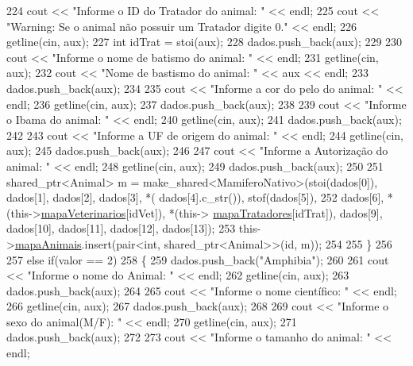 \begin{DoxyCode}
224         cout << \textcolor{stringliteral}{"Informe o ID do Tratador do animal: "} << endl;
225         cout << \textcolor{stringliteral}{"Warning: Se o animal não possuir um Tratador digite 0."} << endl;
226         getline(cin, aux);
227         \textcolor{keywordtype}{int} idTrat = stoi(aux);
228         dados.push\_back(aux);
229 
230         cout << \textcolor{stringliteral}{"Informe o nome de batismo do animal: "} << endl;
231         getline(cin, aux);
232         cout << \textcolor{stringliteral}{"Nome de bastismo do animal: "} << aux << endl;
233         dados.push\_back(aux);
234 
235         cout << \textcolor{stringliteral}{"Informe a cor do pelo do animal: "} << endl;
236         getline(cin, aux);
237         dados.push\_back(aux);
238 
239         cout << \textcolor{stringliteral}{"Informe o Ibama do animal: "} << endl;
240         getline(cin, aux);
241         dados.push\_back(aux);
242 
243         cout << \textcolor{stringliteral}{"Informe a UF de origem do animal: "} << endl;
244         getline(cin, aux);
245         dados.push\_back(aux);
246 
247         cout << \textcolor{stringliteral}{"Informe a Autorização do animal: "} << endl;
248         getline(cin, aux);
249         dados.push\_back(aux);
250 
251         shared\_ptr<Animal> m = make\_shared<MamiferoNativo>(stoi(dados[0]), dados[1], dados[2], dados[3], *(
      dados[4].c\_str()), stof(dados[5]),
252                     dados[6], *(this->\hyperlink{classPetFera_a2bed2112a627bbdb3c0338654330a1ab}{mapaVeterinarios}[idVet]), *(this->
      \hyperlink{classPetFera_ac85920fc6c1471743838e6fe4444304d}{mapaTratadores}[idTrat]), dados[9], dados[10], dados[11], dados[12], dados[13]);
253         this->\hyperlink{classPetFera_ab0ba5fe6332bcffdabb7b03001280697}{mapaAnimais}.insert(pair<\textcolor{keywordtype}{int}, shared\_ptr<Animal>>(\textcolor{keywordtype}{id}, m));
254 
255     \}
256 
257     \textcolor{keywordflow}{else} \textcolor{keywordflow}{if}(valor == 2)
258     \{
259         dados.push\_back(\textcolor{stringliteral}{"Amphibia"});
260 
261         cout << \textcolor{stringliteral}{"Informe o nome do Animal: "} << endl;
262         getline(cin, aux);
263         dados.push\_back(aux);
264 
265         cout << \textcolor{stringliteral}{"Informe o nome científico:  "} << endl;
266         getline(cin, aux);
267         dados.push\_back(aux);
268 
269         cout << \textcolor{stringliteral}{"Informe o sexo do animal(M/F): "} << endl;
270         getline(cin, aux);
271         dados.push\_back(aux);
272 
273         cout << \textcolor{stringliteral}{"Informe o tamanho do animal: "} << endl;

\end{DoxyCode}
